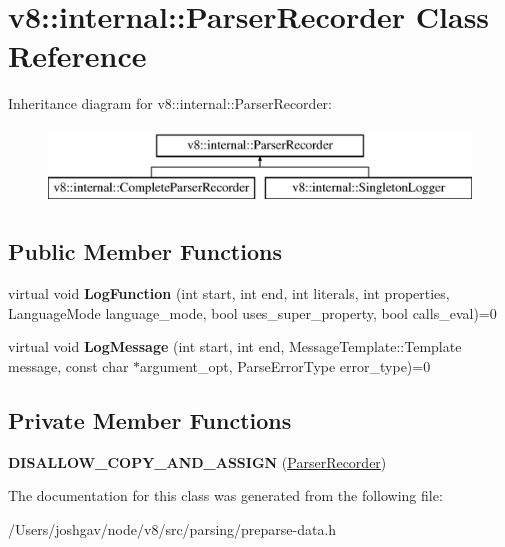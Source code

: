 \hypertarget{classv8_1_1internal_1_1_parser_recorder}{}\section{v8\+:\+:internal\+:\+:Parser\+Recorder Class Reference}
\label{classv8_1_1internal_1_1_parser_recorder}
Inheritance diagram for v8\+:\+:internal\+:\+:Parser\+Recorder\+:\begin{figure}[H]
\begin{center}
\leavevmode
\includegraphics[height=2.000000cm]{classv8_1_1internal_1_1_parser_recorder}
\end{center}
\end{figure}
\subsection*{Public Member Functions}
\begin{DoxyCompactItemize}
\item 
virtual void {\bfseries Log\+Function} (int start, int end, int literals, int properties, Language\+Mode language\+\_\+mode, bool uses\+\_\+super\+\_\+property, bool calls\+\_\+eval)=0\hypertarget{classv8_1_1internal_1_1_parser_recorder_a83ef898df2d0f1a4babdc320e868604a}{}\label{classv8_1_1internal_1_1_parser_recorder_a83ef898df2d0f1a4babdc320e868604a}

\item 
virtual void {\bfseries Log\+Message} (int start, int end, Message\+Template\+::\+Template message, const char $\ast$argument\+\_\+opt, Parse\+Error\+Type error\+\_\+type)=0\hypertarget{classv8_1_1internal_1_1_parser_recorder_a8cee1cd542313059c72180bc70cec822}{}\label{classv8_1_1internal_1_1_parser_recorder_a8cee1cd542313059c72180bc70cec822}

\end{DoxyCompactItemize}
\subsection*{Private Member Functions}
\begin{DoxyCompactItemize}
\item 
{\bfseries D\+I\+S\+A\+L\+L\+O\+W\+\_\+\+C\+O\+P\+Y\+\_\+\+A\+N\+D\+\_\+\+A\+S\+S\+I\+GN} (\hyperlink{classv8_1_1internal_1_1_parser_recorder}{Parser\+Recorder})\hypertarget{classv8_1_1internal_1_1_parser_recorder_a3222fb97bd8eee135572524badfe68bd}{}\label{classv8_1_1internal_1_1_parser_recorder_a3222fb97bd8eee135572524badfe68bd}

\end{DoxyCompactItemize}


The documentation for this class was generated from the following file\+:\begin{DoxyCompactItemize}
\item 
/\+Users/joshgav/node/v8/src/parsing/preparse-\/data.\+h\end{DoxyCompactItemize}
